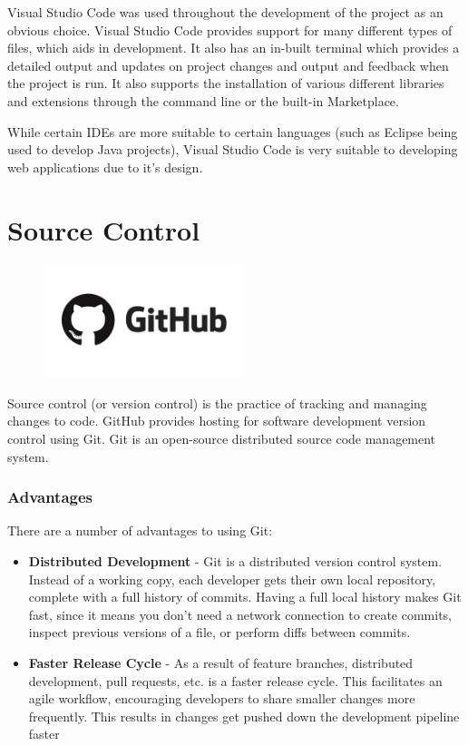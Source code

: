 Visual Studio Code was used throughout the development of the project as an obvious choice. Visual Studio Code provides support for many different types of files, which aids in development. It also has an in-built terminal which provides a detailed output and updates on project changes and output and feedback when the project is run. It also supports the installation of various different libraries and extensions through the command line or the built-in Marketplace. 

While certain IDEs are more suitable to certain languages (such as Eclipse being used to develop Java projects), Visual Studio Code is very suitable to developing web applications due to it's design. 


\section{Source Control}
\begin{center}
    \includegraphics[width=8cm,height=3.3cm,keepaspectratio]{images/github}
\end{center}

Source control (or version control) is the practice of tracking and managing
changes to code. GitHub provides hosting for software development version
control using Git. Git is an open-source distributed source code management
system.

\subsubsection{Advantages}
There are a number of advantages to using Git:

\begin{itemize}
    \item \textbf{Distributed Development} - Git is a distributed version
    control system. Instead of a working copy, each developer gets their own 
    local repository, complete with a full history of commits. Having a full 
    local history makes Git fast, since it means you don’t need a network 
    connection to create commits, inspect previous versions of a file, or 
    perform diffs between commits. 
    \item \textbf{Faster Release Cycle} - As a result of feature branches,
    distributed development, pull requests, etc. is a faster release cycle. This
    facilitates an agile workflow, encouraging developers to share smaller 
    changes more frequently. This results in changes get pushed down the 
    development pipeline faster
\end{itemize}

